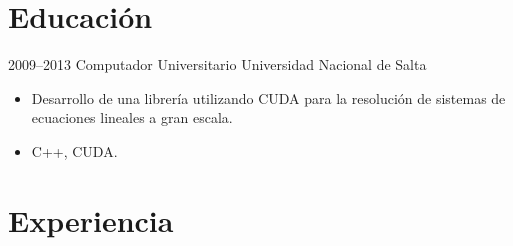 \documentclass[]{cv-style}          %
\begin{document}

\section{Educación}

\begin{entrylist}
\entry
{2009--2013}
{Computador Universitario}
{Universidad Nacional de Salta}
{\jobtitle{,}
\begin{itemize}
\item Desarrollo de una librería utilizando CUDA para la resolución de sistemas de ecuaciones lineales a gran escala.
\item C++, CUDA.
\end{itemize}}

{\vspace{-0.3cm}}
\end{entrylist}

\section{Experiencia}
\end{document}
